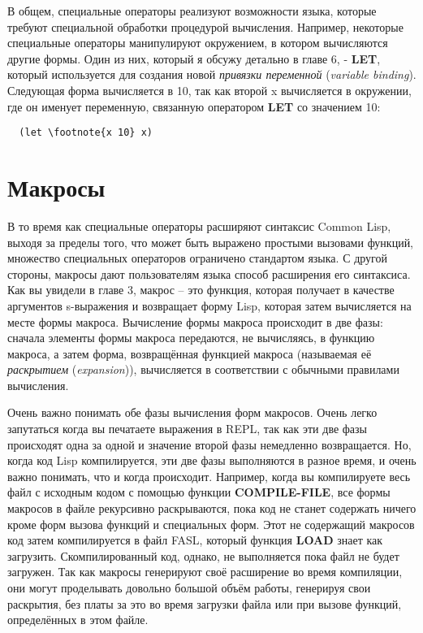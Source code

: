 В общем, специальные операторы реализуют возможности языка, которые требуют специальной
обработки процедурой вычисления. Например, некоторые специальные операторы манипулируют
окружением, в котором вычисляются другие формы. Один из них, который я обсужу детально в
главе 6, - \textbf{LET}, который используется для создания новой \textit{привязки
  переменной} (\textit{variable binding}). Следующая форма вычисляется в 10, так как
второй x вычисляется в окружении, где он именует переменную, связанную оператором
\textbf{LET} со значением 10:

\begin{lstlisting}
  (let \footnote{x 10} x)
\end{lstlisting}

\section{Макросы}

В то время как специальные операторы расширяют синтаксис Common Lisp, выходя за пределы
того, что может быть выражено простыми вызовами функций, множество специальных операторов
ограничено стандартом языка. С другой стороны, макросы дают пользователям языка способ
расширения его синтаксиса. Как вы увидели в главе 3, макрос -- это функция, которая
получает в качестве аргументов s-выражения и возвращает форму Lisp, которая затем
вычисляется на месте формы макроса. Вычисление формы макроса происходит в две фазы:
сначала элементы формы макроса передаются, не вычисляясь, в функцию макроса, а затем
форма, возвращённая функцией макроса (называемая её \textit{раскрытием}
(\textit{expansion})), вычисляется в соответствии с обычными правилами вычисления.

Очень важно понимать обе фазы вычисления форм макросов. Очень легко запутаться когда вы
печатаете выражения в REPL, так как эти две фазы происходят одна за одной и значение
второй фазы немедленно возвращается. Но, когда код Lisp компилируется, эти две фазы
выполняются в разное время, и очень важно понимать, что и когда происходит. Например,
когда вы компилируете весь файл с исходным кодом с помощью функции \textbf{COMPILE-FILE},
все формы макросов в файле рекурсивно раскрываются, пока код не станет содержать ничего
кроме форм вызова функций и специальных форм. Этот не содержащий макросов код затем
компилируется в файл FASL, который функция \textbf{LOAD} знает как
загрузить. Скомпилированный код, однако, не выполняется пока файл не будет загружен. Так
как макросы генерируют своё расширение во время компиляции, они могут проделывать довольно
большой объём работы, генерируя свои раскрытия, без платы за это во время загрузки файла
или при вызове функций, определённых в этом файле.

